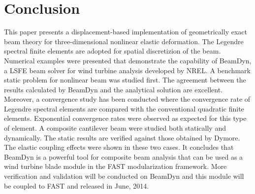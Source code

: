 \section{Conclusion}

This paper presents a displacement-based implementation of geometrically
exact beam theory for three-dimensional nonlinear elastic deformation. The
Legendre spectral finite elements are adopted for spatial discretizion of
the beam. Numerical examples were presented that demonstrate the capability
of BeamDyn, a LSFE beam solver for wind turbine analysis developed by NREL. A benchmark static problem for nonlinear beam was studied first. The agreement between the results calculated by BeamDyn and the analytical solution are excellent. Moreover, a convergence study has been conducted where the convergence rate of Legendre spectral elements are compared with the conventional quadratic finite elements. Exponential convergence rates were observed as expected for this type of element. A composite cantilever beam were studied both statically and dynamically. The static results are verified against those obtained by Dymore. The elastic coupling effects were shown in these two cases. It concludes that BeamDyn is a powerful tool for composite beam analysis that can be used as a wind turbine blade module in the FAST modularization framework. More verification and validation will be conducted on BeamDyn and this module will be coupled to FAST and released in June, 2014. 

